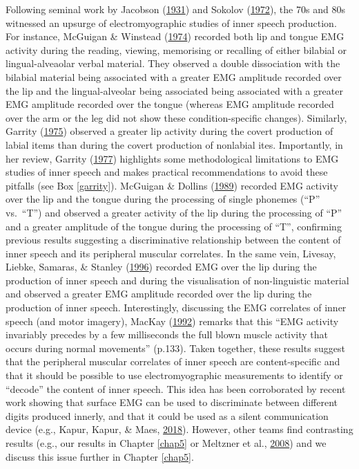 \documentclass[a4paper,12pt,twoside,openright,oldfontcommands]{memoir}
\begin{document}
Following seminal work by Jacobson (\protect\hyperlink{ref-jacobson_electrical_1931}{1931}) and Sokolov (\protect\hyperlink{ref-sokolov_inner_1972}{1972}), the 70s and 80s witnessed an upsurge of electromyographic studies of inner speech production. For instance, McGuigan \& Winstead (\protect\hyperlink{ref-mcguigan_discriminative_1974}{1974}) recorded both lip and tongue EMG activity during the reading, viewing, memorising or recalling of either bilabial or lingual-alveaolar verbal material. They observed a double dissociation with the bilabial material being associated with a greater EMG amplitude recorded over the lip and the lingual-alveolar being associated being associated with a greater EMG amplitude recorded over the tongue (whereas EMG amplitude recorded over the arm or the leg did not show these condition-specific changes). Similarly, Garrity (\protect\hyperlink{ref-garrity_measurement_1975}{1975}) observed a greater lip activity during the covert production of labial items than during the covert production of nonlabial ites. Importantly, in her review, Garrity (\protect\hyperlink{ref-garrity_electromyography_1977}{1977}) highlights some methodological limitations to EMG studies of inner speech and makes practical recommendations to avoid these pitfalls (see Box \ref{garrity}). McGuigan \& Dollins (\protect\hyperlink{ref-mcguigan_patterns_1989}{1989}) recorded EMG activity over the lip and the tongue during the processing of single phonemes (\enquote{P} vs.~\enquote{T}) and observed a greater activity of the lip during the processing of \enquote{P} and a greater amplitude of the tongue during the processing of \enquote{T}, confirming previous results suggesting a discriminative relationship between the content of inner speech and its peripheral muscular correlates. In the same vein, Livesay, Liebke, Samaras, \& Stanley (\protect\hyperlink{ref-livesay_covert_1996}{1996}) recorded EMG over the lip during the production of inner speech and during the visualisation of non-linguistic material and observed a greater EMG amplitude recorded over the lip during the production of inner speech. Interestingly, discussing the EMG correlates of inner speech (and motor imagery), MacKay (\protect\hyperlink{ref-mackay_constraints_1992}{1992}) remarks that this \enquote{EMG activity invariably precedes by a few milliseconds the full blown muscle activity that occurs during normal movements} (p.133). Taken together, these results suggest that the peripheral muscular correlates of inner speech are content-specific and that it should be possible to use electromyographic measurements to identify or \enquote{decode} the content of inner speech. This idea has been corroborated by recent work showing that surface EMG can be used to discriminate between different digits produced innerly, and that it could be used as a silent communication device (e.g., Kapur, Kapur, \& Maes, \protect\hyperlink{ref-kapur_alterego_2018}{2018}). However, other teams find contrasting results (e.g., our results in Chapter \ref{chap5} or Meltzner et al., \protect\hyperlink{ref-meltzner_speech_2008}{2008}) and we discuss this issue further in Chapter \ref{chap5}.
\end{document}
